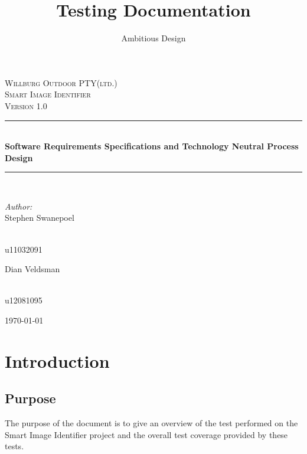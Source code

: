 \documentclass[a4paper,12pt]{report}
\author{Ambitious Design}
\title{Testing Documentation}
\newcommand{\HRule}{\rule{\linewidth}{0.5mm}}
\begin{document}
\setlength{\parskip}{6pt}

\begin{titlepage}

\begin{center}
\textsc{\LARGE Willburg Outdoor PTY(ltd.)}\\[1.5cm]
\textsc{\Large Smart Image Identifier }\\[1.0cm]
\textsc{\Large Version 1.0 }\\[0.5cm]
\HRule \\[0.4cm]
{ \huge \bfseries  Software Requirements Specifications and Technology Neutral Process Design}\\[0.4cm]
\HRule \\[0.4cm]
\begin{minipage}{0.4\textwidth}
\begin{flushleft} \large
\emph{Author:}\\
Stephen {Swanepoel}
\end{flushleft}
\end{minipage}
\begin{minipage}{0.4\textwidth}
\begin{flushright} \large
\emph{} \\
u11032091
\end{flushright}
\end{minipage}
\begin{minipage}{0.4\textwidth}
\begin{flushleft} \large
Dian {Veldsman}
\end{flushleft}
\end{minipage}
\begin{minipage}{0.4\textwidth}
\begin{flushright} \large
\emph{} \\
u12081095
\end{flushright}
\end{minipage}


{\large \today}
\end{center}
\end{titlepage}
\footnotesize
\normalsize

\renewcommand{\thesection}{\arabic{section}}
\newpage

\section {Introduction}
	\subsection {Purpose}
		The purpose of the document is to give an overview of the test performed on the Smart Image Identifier project and the overall test coverage provided by these tests.
\end{document}
